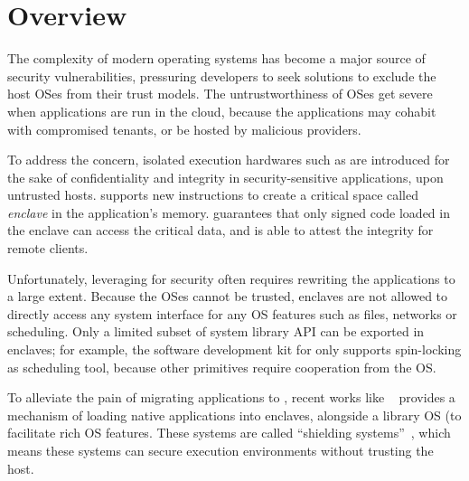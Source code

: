 \section{Overview}

The complexity of modern operating systems has become
a major source of security vulnerabilities,
pressuring developers to seek solutions to exclude the host OSes
from their trust models.
The untrustworthiness of OSes get severe when applications are run in the cloud,
because the applications may cohabit with compromised tenants,
or be hosted by malicious providers.

To address the concern,
isolated execution hardwares such as \sgx{} are introduced
for the sake of confidentiality and integrity in
security-sensitive applications,
upon untrusted hosts.
\sgx{} supports new instructions to create a
critical space called {\it enclave} in the application's memory.
\sgx{} guarantees that only signed code loaded in the enclave can access the critical data,
and is able to attest the integrity for remote clients.


Unfortunately, leveraging \sgx{} for security
often requires rewriting the applications to a large extent.
Because the OSes cannot be trusted,
enclaves are not allowed to directly access any system interface
for any OS features
such as files, networks or scheduling.
Only a limited subset of system library API can be exported in enclaves;
for example, the software development kit for \sgx{}
only supports spin-locking as scheduling tool,
because other primitives require cooperation from the OS.

To alleviate the pain of migrating applications to \sgx{},
recent works like \haven{}~\citep{baumann14haven} provides a mechanism
of loading native applications into enclaves,
alongside a library OS (\libos{) }to facilitate rich OS features.
These systems are called ``shielding systems''~\citep{xu15controlledchannel},
which means these systems can secure execution environments
without trusting the host.

